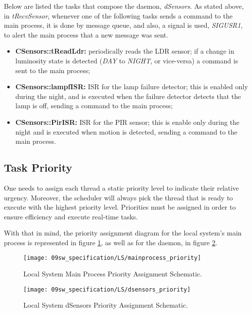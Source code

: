 Below are listed the tasks that compose the daemon, \textit{dSensors}. As stated above, in \textit{tRecvSensor}, whenever one of the following tasks sends a command to the main process, it is done by message queue, and also, a signal is used, \textit{SIGUSR1}, to alert the main process that a new message was sent.
\begin{itemize}
	\item \textbf{CSensors::tReadLdr:} periodically reads the LDR sensor; if a change in luminosity state is detected (\textit{DAY} to \textit{NIGHT}, or vice-versa) a command is sent to the main process;
	\item \textbf{CSensors::lampfISR:} ISR for the lamp failure detector; this is enabled only during the night, and is executed when the failure detector detects that the lamp is off, sending a command to the main process;
	\item \textbf{CSensors::PirISR:} ISR for the PIR sensor; this is enable only during the night and is executed when motion is detected, sending a command to the main process. 
\end{itemize}

\clearpage
\subsection{Task Priority}

One needs to assign each thread a static priority level to indicate their relative urgency. Moreover, the scheduler will always pick the thread that is ready to execute with the highest priority level. Priorities must be assigned in order to ensure efficiency and execute real-time tasks.

With that in mind, the priority assignment diagram for the local system's main process is represented in figure \ref{fig:lst_priority}, as well as for the daemon, in figure \ref{fig:lsdaemont_priority}.

\begin{figure}[H]
	\centering
	\texttt{[image: 09sw\_specification/LS/mainprocess\_priority]}
	\caption{Local System Main Process Priority Assignment Schematic.}
	\label{fig:lst_priority}
\end{figure}

\begin{figure}[H]
	\centering
	\texttt{[image: 09sw\_specification/LS/dsensors\_priority]}
	\caption{Local System dSensors Priority Assignment Schematic.}
	\label{fig:lsdaemont_priority}
\end{figure}


